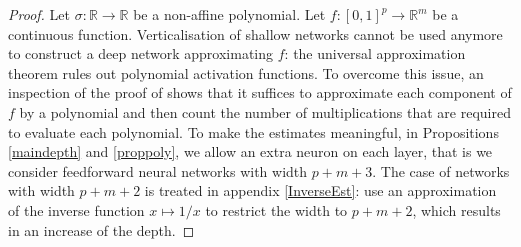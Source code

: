 \documentclass[anon,12pt]{colt2021} %
\begin{document}
\begin{proof}
Let $\sigma: \mathbb{R} \rightarrow \mathbb{R}$ be a non-affine polynomial. Let $f: [0,1]^{p} \rightarrow \mathbb{R}^{m}$ be a continuous function. Verticalisation of shallow networks cannot be used anymore to construct a deep network approximating $f$: the universal approximation theorem rules out polynomial activation functions. To overcome this issue, an inspection of the proof of \citep[Theorem 3.2]{kidger2019universal} shows that it suffices to approximate each component of $f$ by a polynomial and then count the number of multiplications that are required to evaluate each polynomial. To make the estimates meaningful, in Propositions \ref{maindepth} and \ref{proppoly}, we allow an extra neuron on each layer, that is we consider feedforward neural networks with width $p+m+3$. The case of networks with width $p+m+2$ is treated in appendix \ref{InverseEst}:  \cite{kidger2019universal} use an approximation of the inverse function $x \mapsto 1/x$ to restrict the width to $p+m+2$, which results in an increase of the depth.


\end{proof}
\end{document}
